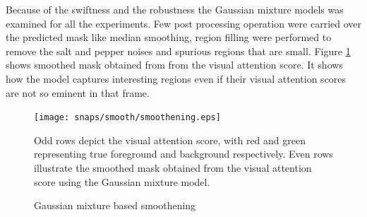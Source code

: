 \par Because of the swiftness and the robustness the Gaussian mixture models was examined for all the experiments. Few post processing operation were carried over the predicted mask like median smoothing, region filling were performed to remove the salt and pepper noises and spurious regions that are small. Figure \ref{fig:smoothen}  shows smoothed mask obtained from from the visual attention score. It shows how the model captures interesting regions even if their visual attention scores are not so eminent in that frame.
\begin{figure}[!htpb]
   \begin{center}
	    \texttt{[image: snaps/smooth/smoothening.eps]}     
     \caption {Gaussian mixture based smoothening}
 	\medskip 
 	\small Odd rows depict the visual attention score, with red and green representing true foreground and background respectively. Even rows illustrate the smoothed mask obtained from the visual attention score using the Gaussian mixture model. 
   \label{fig:smoothen}
   \end{center}
 \end{figure}



